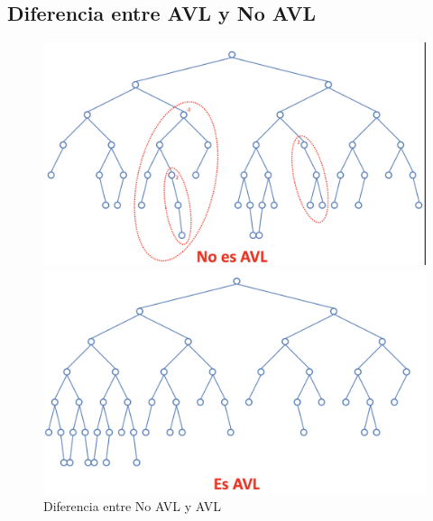\subsection*{Diferencia entre AVL y No AVL}
\begin{figure}[h]
  \begin{minipage}{.5\textwidth}
    \includegraphics[width=\textwidth]{assets/avl1.png}
  \end{minipage}
  \hfill
  \begin{minipage}{.5\textwidth}
    \includegraphics[width=\textwidth]{assets/avl2.png}
  \end{minipage}
  \caption{Diferencia entre No AVL y AVL}
\end{figure}
\newpage
